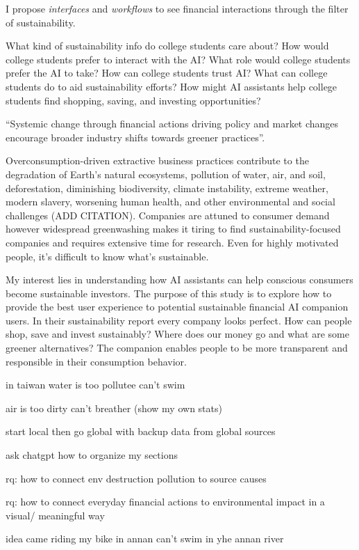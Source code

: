 \documentclass[
  letterpaper,
  DIV=11,
  numbers=noendperiod]{scrartcl}
\begin{document}
I propose \emph{interfaces} and \emph{workflows} to see financial
interactions through the filter of sustainability.

What kind of sustainability info do college students care about? How
would college students prefer to interact with the AI? What role would
college students prefer the AI to take? How can college students trust
AI? What can college students do to aid sustainability efforts? How
might AI assistants help college students find shopping, saving, and
investing opportunities?

``Systemic change through financial actions driving policy and market
changes encourage broader industry shifts towards greener practices''.

Overconsumption-driven extractive business practices contribute to the
degradation of Earth's natural ecosystems, pollution of water, air, and
soil, deforestation, diminishing biodiversity, climate instability,
extreme weather, modern slavery, worsening human health, and other
environmental and social challenges (ADD CITATION). Companies are
attuned to consumer demand however widespread greenwashing makes it
tiring to find sustainability-focused companies and requires extensive
time for research. Even for highly motivated people, it's difficult to
know what's sustainable.

My interest lies in understanding how AI assistants can help conscious
consumers become sustainable investors. The purpose of this study is to
explore how to provide the best user experience to potential sustainable
financial AI companion users. In their sustainability report every
company looks perfect. How can people shop, save and invest sustainably?
Where does our money go and what are some greener alternatives? The
companion enables people to be more transparent and responsible in their
consumption behavior.

in taiwan water is too pollutee can't swim

air is too dirty can't breather (show my own stats)

start local then go global with backup data from global sources

ask chatgpt how to organize my sections

rq: how to connect env destruction pollution to source causes

rq: how to connect everyday financial actions to environmental impact in
a visual/ meaningful way

idea came riding my bike in annan can't swim in yhe annan river
\end{document}
